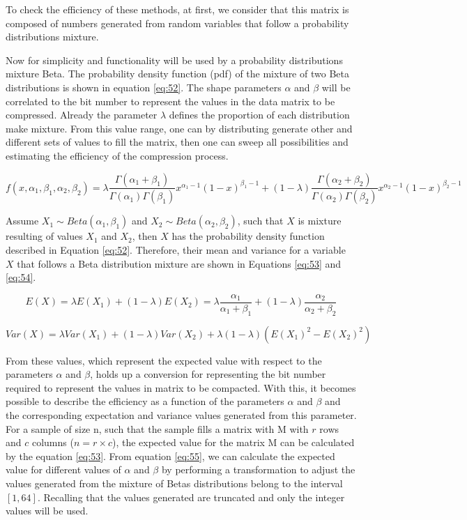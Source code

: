 \documentclass[10pt]{article}
\begin{document}
To check the efficiency of these methods, at first, we consider that this 
matrix is composed of numbers generated from random variables that follow a 
probability distributions mixture. 
 
Now for simplicity and functionality will be used by a probability distributions 
mixture Beta. The probability density function (pdf) of the mixture of two Beta 
distributions is shown in equation \ref{eq:52}. The shape parameters $\alpha$ 
and $\beta$ will be correlated to the bit number to represent the values ​​in 
the data matrix to be compressed. Already the parameter $\lambda$ defines the 
proportion of each distribution make mixture. From this value range​​, one can 
by distributing generate other and different sets of values ​​to fill the 
matrix, then one can sweep all possibilities and estimating the efficiency of 
the compression process. 

\begin{equation}\label{eq:52}
 f(x,\alpha_1,\beta_1,\alpha_2,\beta_2) = \lambda\frac{\Gamma(\alpha_1+\beta_1)}{\Gamma(\alpha_1)\Gamma(\beta_1)}x^{\alpha_1-1}(1-x)^{\beta_1-1} + (1-\lambda)\frac{\Gamma(\alpha_2+\beta_2)}{\Gamma(\alpha_2)\Gamma(\beta_2)}x^{\alpha_2-1}(1-x)^{\beta_2-1}
\end{equation}

Assume $ X_1 \sim Beta(\alpha_1,\beta_1)$ and $X_2 \sim Beta(\alpha_2,\beta_2)$, such that $X$ is mixture resulting of values $X_1$ and $X_2$, then $X$ has the probability density function described in Equation \ref{eq:52}. Therefore, their mean and variance for a variable $X$ that follows a Beta distribution mixture are shown in Equations \ref{eq:53} and \ref{eq:54}.

\begin{equation}\label{eq:53}
 E(X) = \lambda E(X_1) + (1-\lambda) E(X_2) = \lambda \frac{\alpha_1}{\alpha_1+\beta_1} + (1-\lambda)\frac{\alpha_2}{\alpha_2+\beta_2}
\end{equation}

\begin{equation}\label{eq:54}
 Var(X) = \lambda Var(X_1) + (1-\lambda) Var(X_2) + \lambda (1-\lambda) (E(X_1)^2 - E(X_2)^2)
 \end{equation}

From these values​​, which represent the expected value with respect to the parameters $\alpha$ and $\beta$, holds up a conversion for representing the bit number required to represent the values ​​in matrix to be compacted. With this, it becomes possible to describe the efficiency as a function of the parameters $\alpha$ and $\beta$ and the corresponding expectation and variance values ​​generated from this parameter. For a sample of size n, such that the sample fills a matrix with M with $r$ rows and $c$ columns ($n = r  \times c$), the expected value for the matrix M can be calculated by the equation \ref{eq:53}. From equation \ref{eq:55}, we can calculate the expected value for different values ​​of $\alpha$ and $\beta$ by performing a transformation to adjust the values ​​generated from the mixture of Betas distributions belong to the interval $[1,64]$. Recalling that the values ​​generated are truncated and only the integer values ​​will be used.
\end{document}
